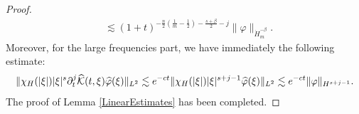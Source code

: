 \documentclass[10pt,a4paper]{amsart}
\begin{document}
\begin{proof}
\begin{align*}
     &\lesssim (1+t)^{-\frac{n}{2}(\frac{1}{m}-\frac{1}{2})-\frac{s+\beta}{2}-j} \|\varphi\|_{\dot{H}_m^{-\beta}}.
\end{align*}
Moreover, for the large frequencies part, we have immediately the following estimate:
$$
\|\chi_{\rm H}(|\xi|)|\xi|^{s}\partial_t^j \widehat{\mathcal{K}}(t,\xi)\widehat{\varphi}(\xi)\|_{L^2} \lesssim e^{-ct}\|\chi_{\rm H}(|\xi|)|\xi|^{s+j-1} \widehat{\varphi}(\xi)\|_{L^2} \lesssim e^{-ct} \|\varphi\|_{H^{s+j-1}}.
$$ 
The proof of Lemma \ref{LinearEstimates} has been completed.    
\end{proof}
\end{document}
